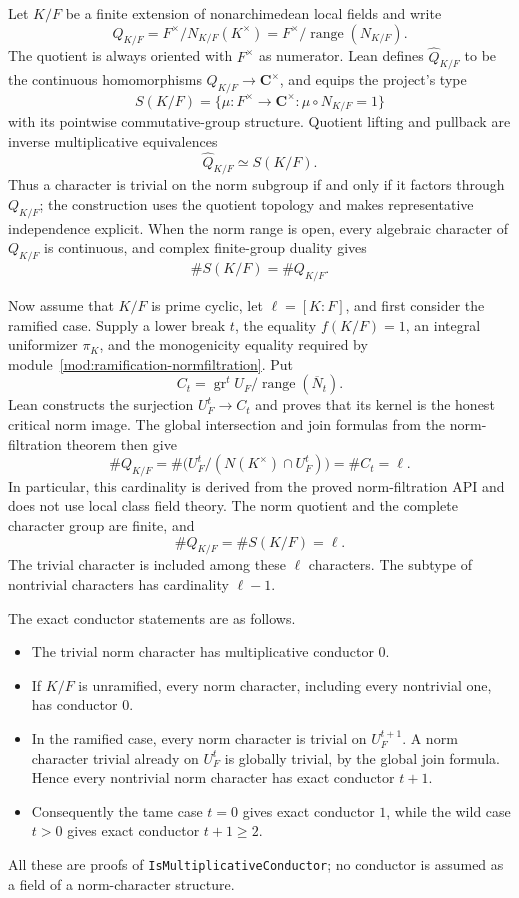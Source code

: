\begin{theorem}
\label{mod:ramification-normcharacters}
Let $K/F$ be a finite extension of nonarchimedean local fields and write
\[
 Q_{K/F}=F^\times/N_{K/F}(K^\times)
 =F^\times/\operatorname{range}(N_{K/F}).
\]
The quotient is always oriented with $F^\times$ as numerator.  Lean defines
$\widehat Q_{K/F}$ to be the continuous homomorphisms
$Q_{K/F}\to\mathbf C^\times$, and equips the project's type
\[
 S(K/F)=\{\mu:F^\times\to\mathbf C^\times:
             \mu\circ N_{K/F}=1\}
\]
with its pointwise commutative-group structure.  Quotient lifting and
pullback are inverse multiplicative equivalences
\[
 \widehat Q_{K/F}\simeq S(K/F).
\]
Thus a character is trivial on the norm subgroup if and only if it factors
through $Q_{K/F}$; the construction uses the quotient topology and makes
representative independence explicit.  When the norm range is open, every
algebraic character of $Q_{K/F}$ is continuous, and complex finite-group
duality gives
\[
 \#S(K/F)=\#Q_{K/F}.
\]

Now assume that $K/F$ is prime cyclic, let
$\ell=[K:F]$, and first consider the ramified case.  Supply a lower break
$t$, the equality $f(K/F)=1$, an integral uniformizer $\pi_K$, and the
monogenicity equality required by
module~\ref{mod:ramification-normfiltration}.  Put
\[
 C_t=\operatorname{gr}^tU_F/
   \operatorname{range}(\overline N_t).
\]
Lean constructs the surjection $U_F^t\to C_t$ and proves that its kernel is
the honest critical norm image.  The global intersection and join formulas
from the norm-filtration theorem then give
\[
 \#Q_{K/F}
 =\#\bigl(U_F^t/(N(K^\times)\cap U_F^t)\bigr)
 =\#C_t=\ell.
\]
In particular, this cardinality is derived from the proved norm-filtration
API and does not use local class field theory.  The norm quotient and the
complete character group are finite, and
\[
 \#Q_{K/F}=\#S(K/F)=\ell.
\]
The trivial character is included among these $\ell$ characters.  The
subtype of nontrivial characters has cardinality $\ell-1$.

The exact conductor statements are as follows.
\begin{itemize}
\item The trivial norm character has multiplicative conductor $0$.
\item If $K/F$ is unramified, every norm character, including every
  nontrivial one, has conductor $0$.
\item In the ramified case, every norm character is trivial on
  $U_F^{t+1}$.  A norm character trivial already on $U_F^t$ is globally
  trivial, by the global join formula.  Hence every nontrivial norm
  character has exact conductor $t+1$.
\item Consequently the tame case $t=0$ gives exact conductor $1$, while
  the wild case $t>0$ gives exact conductor $t+1\ge2$.
\end{itemize}
All these are proofs of \texttt{IsMultiplicativeConductor}; no conductor is
assumed as a field of a norm-character structure.


\end{theorem}
